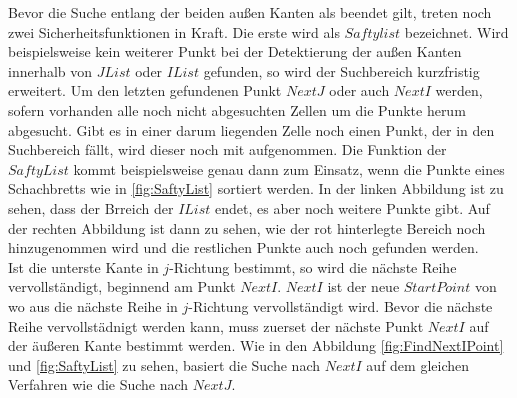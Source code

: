 Bevor die Suche entlang der beiden außen Kanten als beendet gilt, treten noch zwei Sicherheitsfunktionen in Kraft. Die erste wird als $Saftylist$ bezeichnet. Wird beispielsweise kein weiterer Punkt bei der Detektierung der außen Kanten innerhalb von $JList$ oder $IList$ gefunden, so wird der Suchbereich kurzfristig erweitert. Um den letzten gefundenen Punkt $NextJ$ oder auch $NextI$ werden, sofern vorhanden alle noch nicht abgesuchten Zellen um die Punkte herum abgesucht. Gibt es in einer darum liegenden Zelle noch einen Punkt, der in den Suchbereich fällt, wird dieser noch mit aufgenommen. Die Funktion der $SaftyList$ kommt beispielsweise genau dann zum Einsatz, wenn die Punkte eines Schachbretts wie in \ref{fig:SaftyList} sortiert werden. In der linken Abbildung ist zu sehen, dass der Brreich der $IList$ endet, es aber noch weitere Punkte gibt. Auf der rechten Abbildung ist dann zu sehen, wie der rot hinterlegte Bereich noch hinzugenommen wird und die restlichen Punkte auch noch gefunden werden.\\

%
%

Ist die unterste Kante in $j$-Richtung bestimmt, so wird die nächste Reihe vervollständigt, beginnend am Punkt $NextI$. $NextI$ ist der neue $StartPoint$ von wo aus die nächste Reihe in $j$-Richtung vervollständigt wird. Bevor die nächste Reihe vervollstädnigt werden kann, muss zuerset der nächste Punkt $NextI$ auf der äußeren Kante bestimmt werden. Wie in den Abbildung \ref{fig:FindNextIPoint} und \ref{fig:SaftyList} zu sehen, basiert die Suche nach $NextI$ auf dem gleichen Verfahren wie die Suche nach $NextJ$.\\


